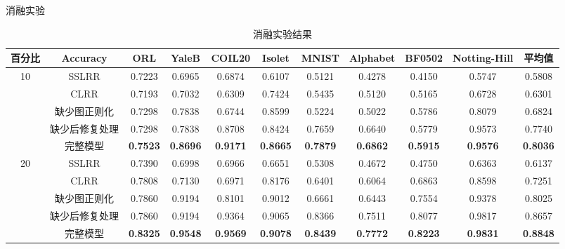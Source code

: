 \documentclass{beamer}
\begin{document}
\begin{frame}{消融实验}
\vspace{-0.25cm}
\begin{table}[H]
    \tiny
		\renewcommand{\arraystretch}{1.4}
		\setlength\tabcolsep{2pt}
		\caption{消融实验结果}
		\label{table_2}
		\centering
		\begin{tabular}{ccccccccccc}
			\hline
			百分比 & \textbf{Accuracy} & ORL & YaleB & COIL20 & Isolet & MNIST & Alphabet & BF0502 & Notting-Hill & \textbf{平均值}\\ 
			\hline
			\multirow{5}{*}{10} 
			& SSLRR & 0.7223 & 0.6965 & 0.6874 & 0.6107 & 0.5121 & 0.4278 & 0.4150 & 0.5747 & 0.5808 \\
			& CLRR & 0.7193 & 0.7032 & 0.6309 & 0.7424 & 0.5435 & 0.5120 & 0.5165 & 0.6728 & 0.6301 \\
			& 缺少图正则化 & 0.7298 & 0.7838 & 0.6744 & 0.8599 & 0.5224 & 0.5022 & 0.5786 & 0.8079 & 0.6824 \\
			& 缺少后修复处理 & 0.7298 & 0.7838 & 0.8708 & 0.8424 & 0.7659 & 0.6640 & 0.5779 & 0.9573 & 0.7740 \\
			& 完整模型 & \textbf{0.7523} & \textbf{0.8696} & \textbf{0.9171} & \textbf{0.8665} & \textbf{0.7879} & \textbf{0.6862} & \textbf{0.5915} & \textbf{0.9576} & \textbf{0.8036}\\
			
			\hline
			\multirow{5}{*}{20}
			& SSLRR & 0.7390 & 0.6998 & 0.6966 & 0.6651 & 0.5308 & 0.4672 & 0.4750 & 0.6363 & 0.6137 \\
			& CLRR & 0.7808 & 0.7130 & 0.6971 & 0.8176 & 0.6401 & 0.6064 & 0.6863 & 0.8598 & 0.7251 \\
			& 缺少图正则化 & 0.7860 & 0.9194 & 0.8101 & 0.9012 & 0.6661 & 0.6443 & 0.7554 & 0.9378 & 0.8025 \\
			& 缺少后修复处理 & 0.7860 & 0.9194 & 0.9364 & 0.9065 & 0.8366 & 0.7511 & 0.8077 & 0.9817 & 0.8657 \\
			& 完整模型 & \textbf{0.8325} & \textbf{0.9548} & \textbf{0.9569} & \textbf{0.9078} & \textbf{0.8439} & \textbf{0.7772} & \textbf{0.8223} & \textbf{0.9831} & \textbf{0.8848}
			\\
			

\end{tabular}
\end{table}
\end{frame}
\end{document}
